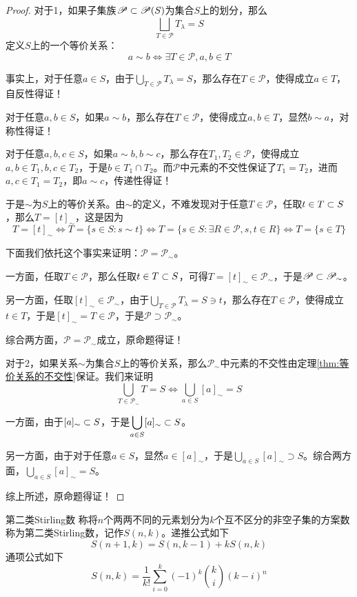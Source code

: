 \begin{proof}
	对于1，如果子集族$\mathscr{P}\subset \mathscr{P}(S)$为集合$S$上的划分，那么
	$$
	\bigsqcup_{ T\in\mathscr{P}}T_\lambda=S
	$$
	定义$S$上的一个等价关系：
	$$
	a\sim b\iff 
	\exists T\in\mathscr{P},a,b\in T
	$$
	
	事实上，对于任意$a\in S$，由于$\displaystyle\bigcup_{ T\in\mathscr{P}}T_\lambda=S$，那么存在$T\in\mathscr{P}$，使得成立$a\in T$，自反性得证！
	
	对于任意$a,b\in S$，如果$a\sim b$，那么存在$T\in\mathscr{P}$，使得成立$a,b\in T$，显然$b\sim a$，对称性得证！
	
	对于任意$a,b,c\in S$，如果$a\sim b,b\sim c$，那么存在$T_1,T_2\in\mathscr{P}$，使得成立$a,b\in T_1,b,c\in T_2$，于是$b\in T_1\cap T_2$。而$\mathscr{P}$中元素的不交性保证了$T_1=T_2$，进而$a,c\in T_1=T_2$，即$a\sim c$，传递性得证！
	
	于是$\sim$为$S$上的等价关系。由$\sim$的定义，不难发现对于任意$T\in\mathscr{P}$，任取$t\in T\subset S$，那么$T=[t]_\sim$，这是因为
	$$
	T=[t]_\sim\iff
	T=\{ s\in S:s\sim t \}\iff
	T=\{ s\in S:\exists R\in\mathscr{P},s,t\in R\}\iff
	T=\{ s\in T \}
	$$
	
	下面我们依托这个事实来证明：$\mathscr{P}=\mathscr{P}_\sim$。
	
	一方面，任取$T\in\mathscr{P}$，那么任取$t\in T\subset S$，可得$T=[t]_\sim \in\mathscr{P}_\sim$，于是$\mathscr{P}\subset\mathscr{P}_\sim$。
	
	另一方面，任取$[t]_\sim\in\mathscr{P}_\sim$，由于$\displaystyle\bigcup_{ T\in\mathscr{P}}T_\lambda=S\ni  t$，那么存在$T\in\mathscr{P}$，使得成立$t\in T$，于是$[t]_\sim =T\in \mathscr{P}$，于是$\mathscr{P}\supset\mathscr{P}_\sim$。
	
	综合两方面，$\mathscr{P}=\mathscr{P}_\sim$成立，原命题得证！
	
	对于2，如果关系$\sim$为集合$S$上的等价关系，那么$\mathscr{P}_\sim$中元素的不交性由定理\ref{thm:等价关系的不交性}保证。我们来证明
	$$
	\bigcup_{T\in\mathscr{P}_\sim}T=S
	\iff\bigcup_{a\in S}[a]_{\sim}=S
	$$
	
	一方面，由于$[a]_\sim\subset S$，于是$\displaystyle\bigcup_{a\in S}[a]_{\sim}\subset S$。
	
	另一方面，由于对于任意$a\in S$，显然$a\in[a]_\sim$，于是$\displaystyle\bigcup_{a\in S}[a]_{\sim}\supset S$。综合两方面，$\displaystyle\bigcup_{a\in S}[a]_{\sim}=S$。
	
	综上所述，原命题得证！
\end{proof}

\begin{definition}{第二类Stirling数}
	称将$n$个两两不同的元素划分为$k$个互不区分的非空子集的方案数称为第二类Stirling数，记作$S(n,k)$。递推公式如下
	$$
	S(n+1,k)=S(n,k-1)+kS(n,k)
	$$
	通项公式如下
	$$
	S(n,k)=\frac{1}{k!}\sum_{i=0}^{k}(-1)^k{k\choose i}(k-i)^n
	$$
\end{definition}

